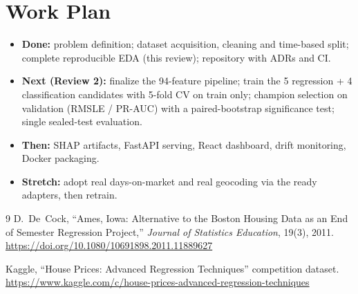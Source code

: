 \documentclass[11pt,a4paper]{article}
\begin{document}
\section{Work Plan}
\begin{itemize}
  \item \textbf{Done:} problem definition; dataset acquisition, cleaning and
        time-based split; complete reproducible EDA (this review); repository
        with ADRs and CI.
  \item \textbf{Next (Review 2):} finalize the 94-feature pipeline; train the
        5 regression + 4 classification candidates with 5-fold CV on train
        only; champion selection on validation (RMSLE / PR-AUC) with a
        paired-bootstrap significance test; single sealed-test evaluation.
  \item \textbf{Then:} SHAP artifacts, FastAPI serving, React dashboard,
        drift monitoring, Docker packaging.
  \item \textbf{Stretch:} adopt real days-on-market and real geocoding via the
        ready adapters, then retrain.
\end{itemize}

\begin{thebibliography}{9}
D.~De~Cock, ``Ames, Iowa: Alternative to the Boston Housing Data as an End of
Semester Regression Project,'' \emph{Journal of Statistics Education},
19(3), 2011. \url{https://doi.org/10.1080/10691898.2011.11889627}

Kaggle, ``House Prices: Advanced Regression Techniques'' competition dataset.
\url{https://www.kaggle.com/c/house-prices-advanced-regression-techniques}
\end{thebibliography}
\end{document}
